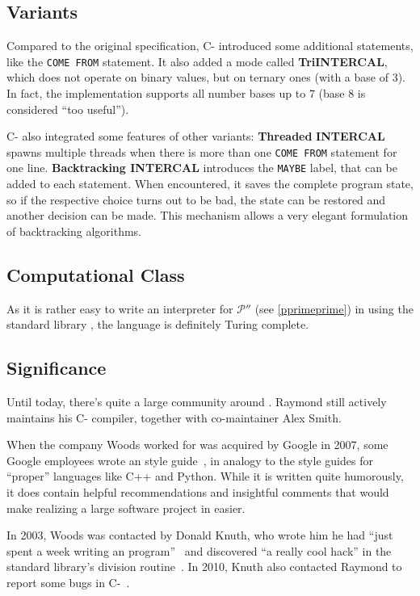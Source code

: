 \subsection{Variants}
\label{intercal-variants}

Compared to the original \ic{} specification, C-\ic{} introduced some additional statements, like the \texttt{COME FROM} statement. It also added a mode called \textbf{TriINTERCAL}, which does not operate on binary values, but on ternary ones (with a base of 3). In fact, the implementation supports all number bases up to 7 (base 8 is considered “too useful”).

C-\ic{} also integrated some features of other \ic{} variants: \textbf{Threaded} \textbf{INTERCAL} spawns multiple threads when there is more than one \texttt{COME FROM} statement for one line. \textbf{Backtracking INTERCAL} introduces the \texttt{MAYBE} label, that can be added to each statement. When encountered, it saves the complete program state, so if the respective choice turns out to be bad, the state can be restored and another decision can be made. This mechanism allows a very elegant formulation of backtracking algorithms.

\subsection{Computational Class}

As it is rather easy to write an interpreter for $\mathcal{P}''$ (see \cref{pprimeprime}) in \ic{} using the standard library \cite{alksentrs2008intercal}, the language is definitely Turing complete.

\subsection{Significance}

Until today, there's quite a large community around \ic{}. Raymond still actively maintains his C-\ic{} compiler, together with co-maintainer Alex Smith.

When the company Woods worked for was acquired by Google in 2007, some Google employees wrote an \ic{} style guide~\cite{raiter2007google}, in analogy to the style guides for “proper” languages like C++ and Python. While it is written quite humorously, it does contain helpful recommendations and insightful comments that would make realizing a large software project in \ic{} easier.

In 2003, Woods was contacted by Donald Knuth, who wrote him he had “just spent a week writing an \ic{} program”~\cite{knuth2003tpk} and discovered “a really cool hack” in the standard library's division routine~\cite{hamilton2008az}. In 2010, Knuth also contacted Raymond to report some bugs in C-\ic{}~\cite{raymond2010donald}.

